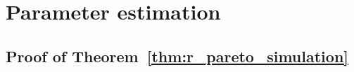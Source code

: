 \documentclass[12pt]{article}
\begin{document}
\newpage 

\section{Parameter estimation}

\subsection{Proof of Theorem~\ref{thm:r_pareto_simulation}}
\end{document}

